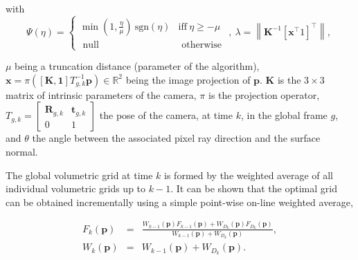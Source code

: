 with
$$
\Psi (\eta) =
\left \{
\begin{array}{cc}
\min(1,\frac{\eta}{\mu}) ~\text{sgn}(\eta) & \text{iff} ~ \eta \geq -\mu \\
\mbox{ null } & \mbox{ otherwise }
\end{array}
\right. , ~
\lambda = \left \| \mathbf{K}^{-1} [\mathbf{x}^\top 1]^\top \right \|,~
$$

$\mu$ being a truncation distance (parameter of the algorithm), $\mathbf{x} = \pi([\mathbf{K},\mathbf 1] T^{-1}_{g,k} \mathbf{p}) \in \mathbb{R}^2$ being the image projection of $\mathbf p$. $\mathbf{K}$ is the $3\times 3$ matrix of intrinsic parameters of the camera, $\pi$ is the projection operator, $T_{g,k} = \left[ \begin{matrix} \mathbf{R}_{g,k} & \mathbf{t}_{g,k} \\ 0 & 1 \end{matrix} \right]$ the pose of the camera, at time $k$, in the global frame $g$, and $\theta$ the angle between the associated pixel ray direction and the surface normal.

The global volumetric grid at time $k$ is formed by the weighted average of all individual volumetric grids up to $k-1$. It can be shown that the optimal grid can be obtained incrementally using a simple point-wise on-line weighted average,

\begin{eqnarray*}
 F_k(\mathbf{p}) &=& \frac{W_{k-1}(\mathbf{p}) F_{k-1}(\mathbf{p}) + W_{D_{k}}(\mathbf{p}) F_{D_{k}}(\mathbf{p}) }{ W_{k-1}(\mathbf{p}) + W_{D_{k}}(\mathbf{p}) }, \\
 W_k(\mathbf{p}) &=& W_{k-1}(\mathbf{p}) + W_{D_{k}}(\mathbf{p}).
\end{eqnarray*}


